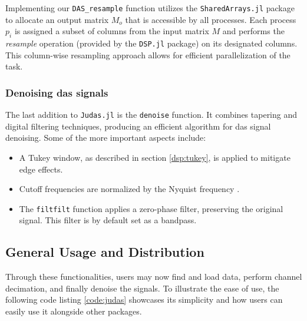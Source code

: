 

Implementing our \texttt{DAS\_resample} function utilizes the \texttt{SharedArrays.jl} package to allocate an output matrix $M_o$ that is accessible by all processes. Each process $p_i$ is assigned a subset of columns from the input matrix $M$ and performs the \textit{resample} operation (provided by the \texttt{DSP.jl} package) on its designated columns. This column-wise resampling approach allows for efficient parallelization of the task.


\subsubsection{Denoising \acrshort{das} signals}



The last addition to \texttt{Judas.jl} is the \texttt{denoise} function. It combines tapering and digital filtering techniques, producing an efficient algorithm for \acrshort{das} signal denoising. Some of the more important aspects include: 

\begin{itemize}
    \item A Tukey window, as described in section \ref{dsp:tukey}, is applied to mitigate edge effects. 
    \item Cutoff frequencies are normalized by the Nyquist frequency \cite{schmogrow2012nyquist}.
    \item The \texttt{filtfilt} function applies a zero-phase filter, preserving the original signal. This filter is by default set as a bandpass. 
\end{itemize}

\subsection{General Usage and Distribution}

Through these functionalities, users may now find and load data, perform channel decimation, and finally denoise the signals. To illustrate the ease of use, the following code listing \ref{code:judas} showcases its simplicity and how users can easily use it alongside other packages. \\



